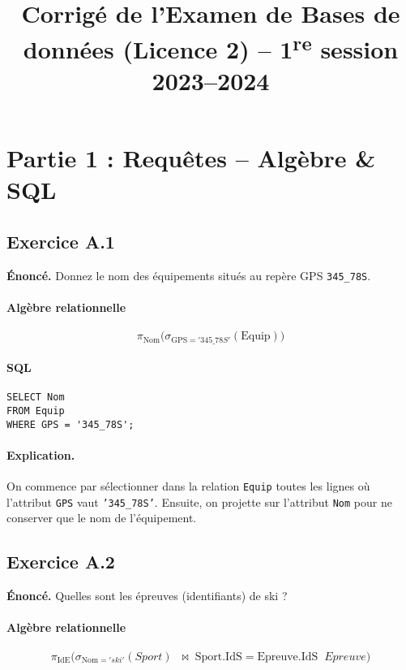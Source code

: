 \documentclass[11pt]{article}
\begin{document}
\title{\textbf{Corrigé de l'Examen de Bases de données (Licence 2) -- 1\textsuperscript{re} session 2023--2024}}
\date{}
\maketitle

\section*{Partie 1 : Requêtes -- Algèbre \& SQL}

\subsection*{Exercice A.1}
\textbf{Énoncé.} Donnez le nom des équipements situés au repère GPS \texttt{345\_78S}.\\

\paragraph{Algèbre relationnelle}
\[
\pi_{\text{Nom}}\bigl(\sigma_{\text{GPS}='345\_78S'}(\text{Equip})\bigr)
\]

\paragraph{SQL}
\begin{verbatim}
SELECT Nom
FROM Equip
WHERE GPS = '345_78S';
\end{verbatim}

\paragraph{Explication.}
On commence par sélectionner dans la relation \texttt{Equip} toutes les lignes où l'attribut \texttt{GPS} vaut \texttt{'345\_78S'}. Ensuite, on projette sur l'attribut \texttt{Nom} pour ne conserver que le nom de l'équipement.

\subsection*{Exercice A.2}
\textbf{Énoncé.} Quelles sont les épreuves (identifiants) de ski ?\\

\paragraph{Algèbre relationnelle}
\[
\pi_{\text{IdE}}\bigl(\sigma_{\text{Nom}='ski'}(Sport) \;\;\bowtie\; \text{Sport.IdS}=\text{Epreuve.IdS}\;\;Epreuve\bigr)
\]
\end{document}
